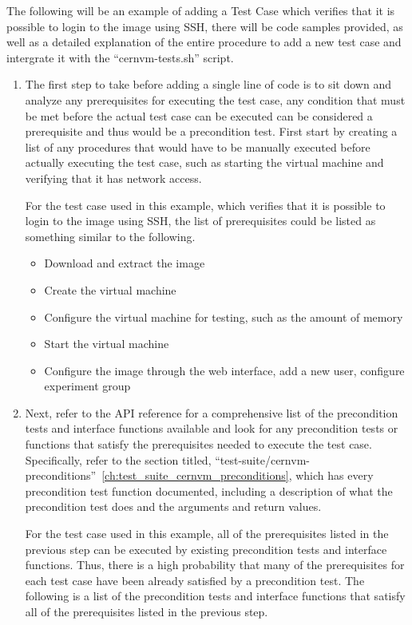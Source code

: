 The following will be an example of adding a \cernvm Test Case which verifies that it is possible to login to the \cernvm image
using SSH, there will be code samples provided, as well as a detailed explanation of the entire procedure to add a new test case
and intergrate it with the ``cernvm-tests.sh'' script.

\begin{enumerate}

\item	The first step to take before adding a single line of code is to sit down and analyze any prerequisites for executing the
			test case, any condition that must be met before the actual test case can be executed can be considered a prerequisite
			and thus would be a precondition test.  First start by creating a list of any procedures that would have to be manually
			executed before actually executing the test case, such as starting the virtual machine and verifying that it has network
			access.
			
			For the test case used in this example, which verifies that it is possible to login to the \cernvm image using SSH, the
			list of prerequisites could be listed as something similar to the following.
			
			\begin{itemize}
			\item	Download and extract the \cernvm image
			\item	Create the virtual machine
			\item	Configure the virtual machine for testing, such as the amount of memory
			\item	Start the virtual machine
			\item	Configure the \cernvm image through the web interface, add a new user, configure experiment group
			\end{itemize}
			
\item	Next, refer to the API reference for a comprehensive list of the precondition tests and interface functions  available 
			and look for any precondition tests or functions that satisfy the prerequisites needed to execute the test case. Specifically,
			refer to the section titled, ``test-suite/cernvm-preconditions''~\ref{ch:test_suite_cernvm_preconditions}, which has every 
			precondition test function documented, including a description of what the precondition test does and the arguments and
			return values.
			
			For the test case used in this example, all of the prerequisites listed in the previous step can be executed
			by existing precondition tests and interface functions. Thus, there is a high probability that many of the prerequisites for
			each test case have been already satisfied by a precondition test. The following is a list of the precondition tests and
			interface functions that satisfy all of the prerequisites listed in the previous step.
			

\end{enumerate}
